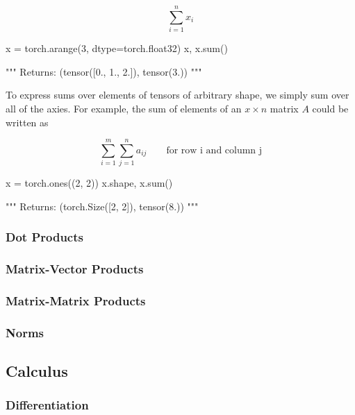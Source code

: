 \documentclass[12pt]{article}
\begin{document}
$$
\sum_{i=1}^{n}{x_{i}}
$$

\vspace{6pt}
\begin{python}
x = torch.arange(3, dtype=torch.float32)
x, x.sum()

"""
Returns:
  (tensor([0., 1., 2.]), tensor(3.))
"""
\end{python}
\vspace{6pt}

To express sums over elements of tensors of arbitrary shape, we simply sum over all of the axies.  For example, the sum of elements of an $x \times n$ matrix $A$ could be written as

$$
\sum_{i=1}^{m}\sum_{j=1}^{n}{a_{ij}} \qquad \text{for row i and column j}
$$

\vspace{6pt}
\begin{python}
x = torch.ones((2, 2))
x.shape, x.sum()

"""
Returns:
  (torch.Size([2, 2]), tensor(8.))
"""
\end{python}
\vspace{6pt}

\subsubsection{Dot Products}

\subsubsection{Matrix-Vector Products}

\subsubsection{Matrix-Matrix Products}

\subsubsection{Norms}


\subsection{Calculus}
\subsubsection{Differentiation}
\end{document}
